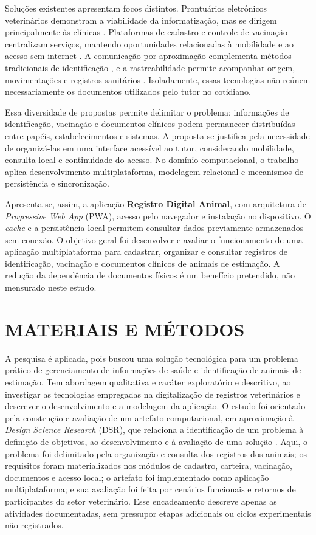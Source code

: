\documentclass{UNESC}
\begin{document}
Soluções existentes apresentam focos distintos. Prontuários eletrônicos veterinários demonstram a viabilidade da informatização, mas se dirigem principalmente às clínicas \cite{iskandar2023}. Plataformas de cadastro e controle de vacinação centralizam serviços, mantendo oportunidades relacionadas à mobilidade e ao acesso sem internet \cite{vieira2025}. A comunicação por aproximação complementa métodos tradicionais de identificação \cite{sartori2018}, e a rastreabilidade permite acompanhar origem, movimentações e registros sanitários \cite{zhao2020}. Isoladamente, essas tecnologias não reúnem necessariamente os documentos utilizados pelo tutor no cotidiano.

Essa diversidade de propostas permite delimitar o problema: informações de identificação, vacinação e documentos clínicos podem permanecer distribuídas entre papéis, estabelecimentos e sistemas. A proposta se justifica pela necessidade de organizá-las em uma interface acessível ao tutor, considerando mobilidade, consulta local e continuidade do acesso. No domínio computacional, o trabalho aplica desenvolvimento multiplataforma, modelagem relacional e mecanismos de persistência e sincronização.

Apresenta-se, assim, a aplicação \textbf{Registro Digital Animal}, com arquitetura de \textit{Progressive Web App} (PWA), acesso pelo navegador e instalação no dispositivo. O \textit{cache} e a persistência local permitem consultar dados previamente armazenados sem conexão. O objetivo geral foi desenvolver e avaliar o funcionamento de uma aplicação multiplataforma para cadastrar, organizar e consultar registros de identificação, vacinação e documentos clínicos de animais de estimação. A redução da dependência de documentos físicos é um benefício pretendido, não mensurado neste estudo.

\section{MATERIAIS E MÉTODOS}

A pesquisa é aplicada, pois buscou uma solução tecnológica para um problema prático de gerenciamento de informações de saúde e identificação de animais de estimação. Tem abordagem qualitativa e caráter exploratório e descritivo, ao investigar as tecnologias empregadas na digitalização de registros veterinários e descrever o desenvolvimento e a modelagem da aplicação. O estudo foi orientado pela construção e avaliação de um artefato computacional, em aproximação à \textit{Design Science Research} (DSR), que relaciona a identificação de um problema à definição de objetivos, ao desenvolvimento e à avaliação de uma solução \cite{peffers2007}. Aqui, o problema foi delimitado pela organização e consulta dos registros dos animais; os requisitos foram materializados nos módulos de cadastro, carteira, vacinação, documentos e acesso local; o artefato foi implementado como aplicação multiplataforma; e sua avaliação foi feita por cenários funcionais e retornos de participantes do setor veterinário. Esse encadeamento descreve apenas as atividades documentadas, sem pressupor etapas adicionais ou ciclos experimentais não registrados.
\end{document}
